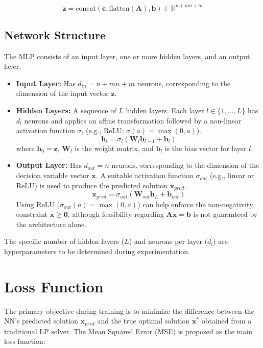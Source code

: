 \documentclass{article}
\begin{document}
\begin{equation}
\mathbf{z} = \text{concat}(\mathbf{c}, \text{flatten}(\mathbf{A}), \mathbf{b}) \in \mathbb{R}^{n + mn + m}
\end{equation}

\subsection{Network Structure}
The MLP consists of an input layer, one or more hidden layers, and an output layer.
\begin{itemize}
    \item \textbf{Input Layer:} Has $d_{in} = n + mn + m$ neurons, corresponding to the dimension of the input vector $\mathbf{z}$.
    \item \textbf{Hidden Layers:} A sequence of $L$ hidden layers. Each layer $l \in \{1, \dots, L\}$ has $d_l$ neurons and applies an affine transformation followed by a non-linear activation function $\sigma_l$ (e.g., ReLU: $\sigma(a) = \max(0, a)$).
    \begin{equation}
    \mathbf{h}_l = \sigma_l(\mathbf{W}_l \mathbf{h}_{l-1} + \mathbf{b}_l)
    \end{equation}
    where $\mathbf{h}_0 = \mathbf{z}$, $\mathbf{W}_l$ is the weight matrix, and $\mathbf{b}_l$ is the bias vector for layer $l$.
    \item \textbf{Output Layer:} Has $d_{out} = n$ neurons, corresponding to the dimension of the decision variable vector $\mathbf{x}$. A suitable activation function $\sigma_{out}$ (e.g., linear or ReLU) is used to produce the predicted solution $\mathbf{x}_{pred}$.
    \begin{equation}
    \mathbf{x}_{pred} = \sigma_{out}(\mathbf{W}_{out} \mathbf{h}_L + \mathbf{b}_{out})
    \end{equation}
    Using ReLU ($\sigma_{out}(a) = \max(0, a)$) can help enforce the non-negativity constraint $\mathbf{x} \ge \mathbf{0}$, although feasibility regarding $\mathbf{A}\mathbf{x} = \mathbf{b}$ is not guaranteed by the architecture alone.
\end{itemize}
The specific number of hidden layers ($L$) and neurons per layer ($d_l$) are hyperparameters to be determined during experimentation.

\section{Loss Function}

The primary objective during training is to minimize the difference between the NN's predicted solution $\mathbf{x}_{pred}$ and the true optimal solution $\mathbf{x}^*$ obtained from a traditional LP solver. The Mean Squared Error (MSE) is proposed as the main loss function:
\end{document}

